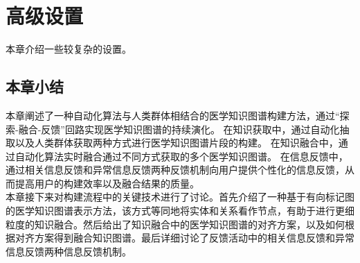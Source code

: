 \chapter{高级设置}
本章介绍一些较复杂的设置。
\section{本章小结} \label{sec:chap2章节小结}
本章阐述了一种自动化算法与人类群体相结合的医学知识图谱构建方法，通过“探索-融合-反馈”回路实现医学知识图谱的持续演化。
在知识获取中，通过自动化抽取以及人类群体获取两种方式进行医学知识图谱片段的构建。
在知识融合中，通过自动化算法实时融合通过不同方式获取的多个医学知识图谱。
在信息反馈中，通过相关信息反馈和异常信息反馈两种反馈机制向用户提供个性化的信息反馈，从而提高用户的构建效率以及融合结果的质量。\\
\indent 本章接下来对构建流程中的关键技术进行了讨论。首先介绍了一种基于有向标记图的医学知识图谱表示方法，该方式等同地将实体和关系看作节点，有助于进行更细粒度的知识融合。然后给出了知识融合中的医学知识图谱的对齐方案，以及如何根据对齐方案得到融合知识图谱。最后详细讨论了反馈活动中的相关信息反馈和异常信息反馈两种信息反馈机制。

